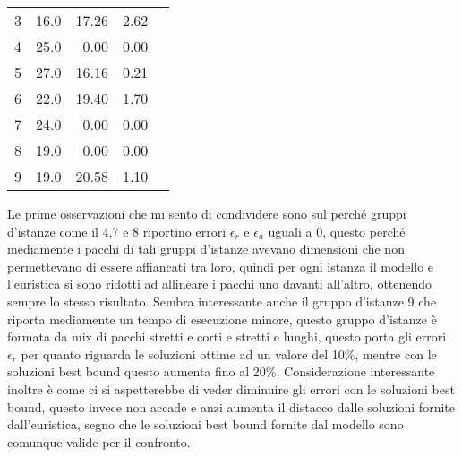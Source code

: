 \begin{center}
\begin{table}[H]
\begin{minipage}{0.5\textwidth}
\begin{tabular}{lrrrr}
				3  & 16.0  & 17.26        & 2.62         \\
				4  & 25.0  & 0.00         & 0.00         \\
				5  & 27.0  & 16.16        & 0.21         \\
				6  & 22.0  & 19.40        & 1.70         \\
				7  & 24.0  & 0.00         & 0.00         \\
				8  & 19.0  & 0.00         & 0.00         \\
				9  & 19.0  & 20.58        & 1.10         \\
				\bottomrule
			\end{tabular}
		\end{minipage}
	\end{table}
\end{center}
Le prime osservazioni che mi sento di condividere sono sul perché gruppi d'istanze come il 4,7 e 8 riportino errori $\epsilon_r$ e $\epsilon_a$ uguali a 0, questo perché mediamente i pacchi di tali gruppi d'istanze avevano dimensioni che non permettevano di essere affiancati tra loro, quindi per ogni istanza il modello e l'euristica si sono ridotti ad allineare i pacchi uno davanti all'altro, ottenendo sempre lo stesso risultato. Sembra interessante anche il gruppo d'istanze 9 che riporta mediamente un tempo di esecuzione minore, questo gruppo d'istanze è formata da mix di pacchi stretti e corti e stretti e lunghi, questo porta gli errori $\epsilon_r$ per quanto riguarda le soluzioni ottime ad un valore del 10\%, mentre con le soluzioni best bound questo aumenta fino al 20\%.
Considerazione interessante inoltre è come ci si aspetterebbe di veder diminuire gli errori con le soluzioni best bound, questo invece non accade e anzi aumenta il distacco dalle soluzioni fornite dall'euristica, segno che le soluzioni best bound fornite dal modello sono comunque valide per il confronto.

\newpage
